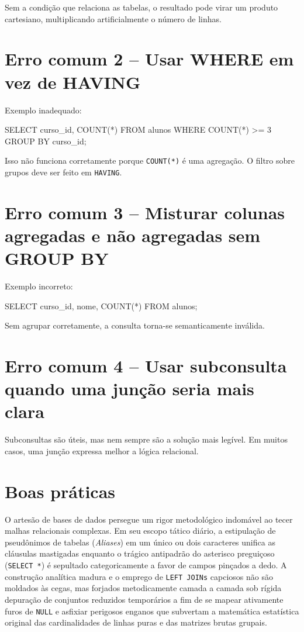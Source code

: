 Sem a condição que relaciona as tabelas, o resultado pode virar um produto cartesiano, multiplicando artificialmente o número de linhas.

\section{Erro comum 2 -- Usar WHERE em vez de HAVING}

Exemplo inadequado:

\begin{sqlcode}
SELECT curso_id, COUNT(*)
FROM alunos
WHERE COUNT(*) >= 3
GROUP BY curso_id;
\end{sqlcode}

Isso não funciona corretamente porque \texttt{COUNT(*)} é uma agregação. O filtro sobre grupos deve ser feito em \texttt{HAVING}.

\section{Erro comum 3 -- Misturar colunas agregadas e não agregadas sem GROUP BY}

Exemplo incorreto:

\begin{sqlcode}
SELECT curso_id, nome, COUNT(*)
FROM alunos;
\end{sqlcode}

Sem agrupar corretamente, a consulta torna-se semanticamente inválida.

\section{Erro comum 4 -- Usar subconsulta quando uma junção seria mais clara}

Subconsultas são úteis, mas nem sempre são a solução mais legível. Em muitos casos, uma junção expressa melhor a lógica relacional.

\section{Boas práticas}

O artesão de bases de dados persegue um rigor metodológico indomável ao tecer malhas relacionais complexas. Em seu escopo tático diário, a estipulação de pseudônimos de tabelas (\textit{Aliases}) em um único ou dois caracteres unifica as cláusulas mastigadas enquanto o trágico antipadrão do asterisco preguiçoso (\texttt{SELECT *}) é sepultado categoricamente a favor de campos pinçados a dedo. A construção analítica madura e o emprego de \texttt{LEFT JOINs} capciosos não são moldados às cegas, mas forjados metodicamente camada a camada sob rígida depuração de conjuntos reduzidos temporários a fim de se mapear ativamente furos de \texttt{NULL} e asfixiar perigosos enganos que subvertam a matemática estatística original das cardinalidades de linhas puras e das matrizes brutas grupais.

